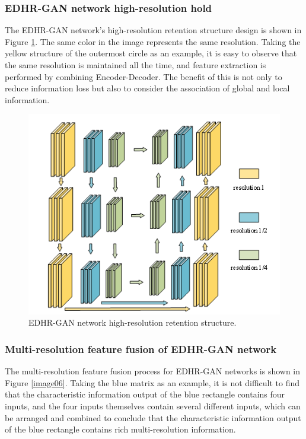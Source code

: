 \subsubsection{EDHR-GAN network high-resolution hold}

The EDHR-GAN network's high-resolution retention structure design is shown in Figure \ref{image05}. The same color in the image represents the same resolution. Taking the yellow structure of the outermost circle as an example, it is easy to observe that the same resolution is maintained all the time, and feature extraction is performed by combining Encoder-Decoder. The benefit of this is not only to reduce information loss but also to consider the association of global and local information.
	
	\begin{figure}
		\centering
		\includegraphics[scale=1]{image05.png}
		\caption{EDHR-GAN network high-resolution retention structure.}
		\label{image05}
	\end{figure}
	
\subsubsection{Multi-resolution feature fusion of EDHR-GAN network}
	
The multi-resolution feature fusion process for EDHR-GAN networks is shown in Figure \ref{image06}. Taking the blue matrix as an example, it is not difficult to find that the characteristic information output of the blue rectangle contains four inputs, and the four inputs themselves contain several different inputs, which can be arranged and combined to conclude that the characteristic information output of the blue rectangle contains rich multi-resolution information.
	
